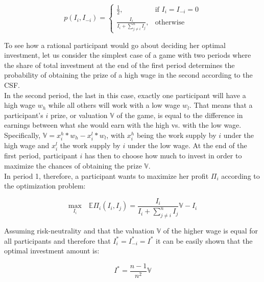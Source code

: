 \begin{equation}
    p(I_i,I_{-i}) =
\begin{cases}
    \frac{1}{2},& \text{if } I_i = I_{-i} = 0\\
    \frac{I_i}{I_i + \sum_{j\neq i}^n I_{j}},              & \text{otherwise}
\end{cases}
\label{eq:csf}    
\end{equation}

\hfill \break

To see how a rational participant would go about deciding her optimal investment, let us consider the simplest case of a game with two periods where the share of total investment at the end of the first period determines the probability of obtaining the prize of a high wage in the second according to the CSF.\\

In the second period, the last in this case, exactly one participant will have a high wage $w_h$ while all others will work with a low wage $w_l$. That means that a participant's $i$ prize, or valuation $\mathbb{V}$ of the game, is equal to the difference in earnings between what she would earn with the high vs. with the low wage. Specifically, $\mathbb{V} = x_i^h*w_h - x_i^l*w_l$, with $x_i^h$ being the work supply by $i$ under the high wage and $x_i^l$ the work supply by $i$ under the low wage. At the end of the first period, participant $i$ has then to choose how much to invest in order to maximize the chances of obtaining the prize $\mathbb{V}$.\\

In period 1, therefore, a participant wants to maximize her profit $\Pi_i$ according to the optimization problem:

\begin{equation}
    \underset{I_i}{\text{max}}\quad\mathbb{E}\Pi_i(I_i,I_j) = \frac{I_i}{I_i + \sum_{j\neq i}^n I_{j}}\mathbb{V} - I_i
\label{eq:exp_util}
\end{equation}

Assuming risk-neutrality and that the valuation $\mathbb{V}$ of the higher wage is equal for all participants and therefore that $I_i^{*}=I_{-i}^{*}=I^{*}$ it can be easily shown that the optimal investment amount is:

\begin{equation}
    I^{*} = \frac{n-1}{n^2}\mathbb{V}
\label{eq:opt_last}
\end{equation}

\hfill \break 


